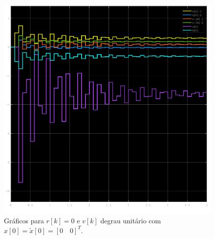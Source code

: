 \documentclass{article}
\begin{document}
    \begin{figure}[H]
        \centering
        \includegraphics[width=.6\linewidth]{images/q5_r0_v1.png}
        \caption{Gráficos para $r[k] = 0$ e $v[k]$ degrau unitário com $x[0] = \tilde{x}[0] = [0\quad 0]^T$.}\label{fig:q5_r0_v1}
    \end{figure}
\end{document}
